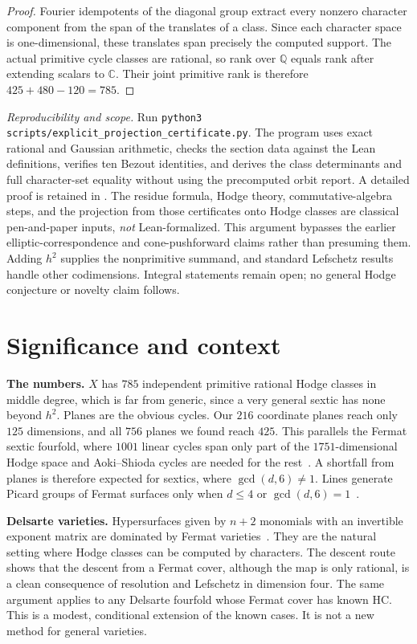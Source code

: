 \documentclass[11pt]{amsart}
\theoremstyle{remark}\newtheorem{remark}[theorem]{Remark}
\newcommand{\Q}{\mathbb{Q}}\newcommand{\PP}{\mathbb{P}}
\begin{document}
\begin{proof}
Fourier idempotents of the diagonal group extract every nonzero character
component from the span of the translates of a class. Since each character
space is one-dimensional, these translates span precisely the computed
support. The actual primitive cycle classes are rational, so rank over
$\Q$ equals rank after extending scalars to $\mathbb C$. Their joint
primitive rank is therefore $425+480-120=785$.
\end{proof}

\emph{Reproducibility and scope.} Run
\texttt{python3 scripts/explicit\_projection\_certificate.py}.
The program uses exact rational and Gaussian arithmetic, checks the section
data against the Lean definitions, verifies ten Bezout identities, and derives
the class determinants and full character-set equality without using the
precomputed orbit report. A detailed proof is retained in
.
The residue formula, Hodge theory, commutative-algebra steps, and the
projection from those certificates onto Hodge classes are classical
pen-and-paper inputs, \emph{not} Lean-formalized. This argument bypasses the earlier
elliptic-correspondence and cone-pushforward claims rather than presuming them.
Adding $h^2$ supplies the nonprimitive summand, and standard Lefschetz results
handle other codimensions. Integral statements remain open; no general Hodge
conjecture or novelty claim follows.
\section{Significance and context}
\textbf{The numbers.} $X$ has $785$ independent primitive rational Hodge classes in middle degree, which
is far from generic, since a very general sextic has none beyond $h^2$. Planes are the obvious
cycles. Our $216$ coordinate planes reach only $125$ dimensions, and all $756$ planes we found
reach $425$. This parallels the Fermat sextic fourfold, where $1001$ linear cycles span only part
of the $1751$-dimensional Hodge space and Aoki--Shioda cycles are needed for the rest~\cite{BFLV}.
A shortfall from planes is therefore expected for sextics, where $\gcd(d,6)\ne1$. Lines generate
Picard groups of Fermat surfaces only when $d\le4$ or $\gcd(d,6)=1$~\cite{Deg15}.

\textbf{Delsarte varieties.} Hypersurfaces given by $n+2$ monomials with an invertible exponent
matrix are dominated by Fermat varieties~\cite{Shi86}. They are the natural setting where Hodge
classes can be computed by characters. The descent route shows that the descent from a Fermat cover,
although the map is only rational, is a clean consequence of resolution and Lefschetz in
dimension four. The same argument applies to any Delsarte fourfold whose Fermat cover has known
HC. This is a modest, conditional extension of the known cases. It is not a new method for
general varieties.
\end{document}
